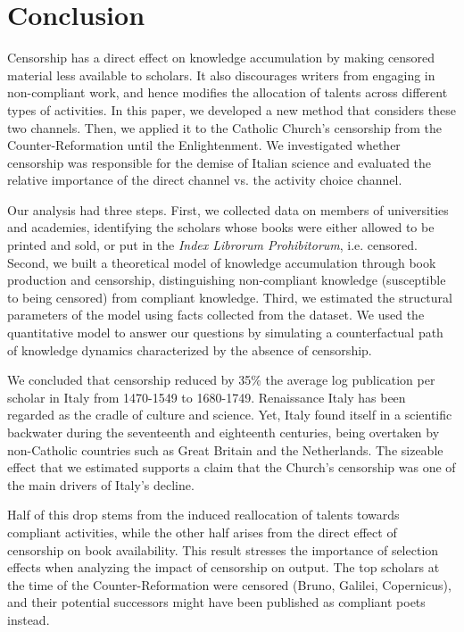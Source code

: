 \section{Conclusion}

Censorship has a direct effect on knowledge accumulation by making censored material less available to scholars. It also discourages writers from engaging in non-compliant work, and hence modifies the allocation of talents across different types of activities.
In this paper, we developed a new method that considers these two channels. Then, we applied it to the Catholic Church's censorship from the Counter-Reformation until the Enlightenment. We investigated whether censorship was responsible for the demise of Italian science and evaluated the relative importance of the direct channel vs. the activity choice channel.

Our analysis had three steps. First, we collected data on members of universities and academies, identifying the scholars whose books were either allowed to be printed and sold, or put in the \textit{Index Librorum Prohibitorum},  i.e. censored. Second, we built a theoretical model of knowledge accumulation through book production and censorship, distinguishing non-compliant knowledge (susceptible to being censored) from compliant knowledge. Third, we estimated the structural parameters of the model using facts collected from the dataset. We used the quantitative model to answer our questions by simulating a counterfactual path of knowledge dynamics characterized by the absence of censorship.

We concluded that censorship reduced by 35\% the average log publication per scholar in Italy from 1470-1549 to 1680-1749. Renaissance Italy has been regarded as the cradle of culture and science. Yet, Italy found itself in a scientific backwater during the seventeenth and eighteenth centuries, being overtaken by non-Catholic countries such as Great Britain and the Netherlands. The sizeable effect that we estimated supports a claim that the Church's censorship was one of the main drivers of Italy's decline.

Half of this drop stems from the induced reallocation of talents towards compliant activities, while the other half arises from the direct effect of censorship on book availability. This result stresses the importance of selection effects when analyzing the impact of censorship on output. The top scholars at the time of the Counter-Reformation were  censored (Bruno, Galilei, Copernicus), and their potential successors might have been published as  compliant poets instead.

